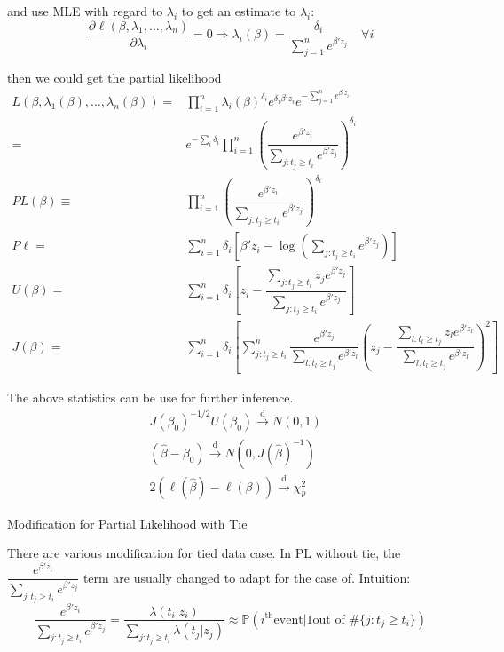 and use MLE with regard to $ \lambda _i $ to get an estimate to $ \lambda _i $: 
\begin{equation}
    \dfrac{\partial^{} \ell(\beta ,\lambda _1,\ldots,\lambda _n)}{\partial \lambda _i^{}}=0\Rightarrow \lambda _i(\beta )=\dfrac{\delta _i}{\sum_{j=1}^ne^{\beta 'z_j}} \quad \forall i
\end{equation}

then we could get the partial likelihood
\begin{align}
    L(\beta ,\lambda _1(\beta ),\ldots,\lambda _n(\beta ))=&\prod_{i=1}^n\lambda _i(\beta )^{\delta _i}e^{\delta _i\beta 'z_i}e^{-\sum_{j=1}^ne^{\beta 'z_i}}\\
    =&e^{-\sum_i\delta _i}\prod_{i=1}^n\left( \dfrac{e^{\beta 'z_i}}{\sum_{j:t_j\geq t_i}e^{\beta 'z_j}} \right)^{\delta _i}\\
    PL(\beta )\equiv&\prod_{i=1}^n\left( \dfrac{e^{\beta 'z_i}}{\sum_{j:t_j\geq t_i}e^{\beta 'z_j}} \right)^{\delta_i}\\
    P\ell=&\sum_{i=1}^n\delta _i\left[ \beta 'z_i-\log\left(\sum_{j:t_j\geq t_i}e^{\beta 'z_j}\right) \right]\\
    U(\beta )=&\sum_{i=1}^n\delta _i\left[ z_i-\dfrac{\sum_{j:t_j\geq t_i}z_je^{\beta 'z_j}}{\sum_{j:t_j\geq t_i}e^{\beta 'z_j}} \right]\\
    J(\beta )=&\sum_{i=1}^n\delta _i\left[ \sum_{j:t_j\geq t_i}^n \dfrac{e^{\beta 'z_j}}{\sum_{l:t_l\geq t_j}e^{\beta 'z_l}} \left( z_j-\dfrac{\sum_{l:t_l\geq t_j}z_le^{\beta 'z_l}}{\sum_{l:t_l\geq t_j}e^{\beta 'z_l}} \right)^2 \right]
\end{align}

The above statistics can be use for further inference.
\begin{align}
    &J(\beta _0)^{-1/2}U(\beta _0)\xrightarrow[]{\mathrm{d}} N(0,1)\\
    &(\hat{\beta }-\beta _0)\xrightarrow[]{\mathrm{d}} N(0,J(\hat{\beta })^{-1})\\
    &2(\ell(\hat{\beta })-\ell(\beta))\xrightarrow[]{\mathrm{d}} \chi^2_p
\end{align}

\begin{point}
    Modification for Partial Likelihood with Tie
\end{point}

There are various modification for tied data case. In PL without tie, the $ \dfrac{e^{\beta 'z_i}}{\sum_{j:t_j\geq t_i}e^{\beta 'z_j}} $ term are usually changed to adapt for the case of. Intuition:
\begin{equation}
    \dfrac{e^{\beta 'z_i}}{\sum_{j:t_j\geq t_i}e^{\beta 'z_j}}=\dfrac{\lambda (t_i|z_i)}{\sum_{j:t_j\geq t_i}\lambda (t_j|z_j)}\approx \mathbb{P}\left( i^\mathrm{th} \text{event}|1\text{out of }\# \{j:t_j\geq t_i\}  \right) 
\end{equation}

